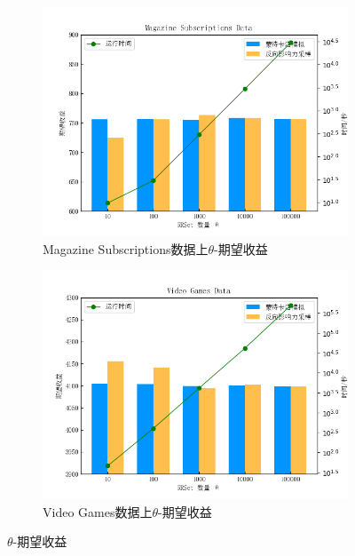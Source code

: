 \begin{figure}[th]
    \begin{subfigure}{0.45\textwidth}
       \includegraphics[width=\linewidth]{figure/sasim/theta/cn_magazine}
        \caption{Magazine Subscriptions数据上$\theta$-期望收益}
        \label{fig:thetasub3}
    \end{subfigure}
    \hfill
    \begin{subfigure}{0.45\textwidth}
        \includegraphics[width=\linewidth]{figure/sasim/theta/cn_video}
        \caption{Video Games数据上$\theta$-期望收益}
        \label{fig:thetasub4}
    \end{subfigure}

    \caption{$\theta$-期望收益}
    \label{fig:theta}
\end{figure}

